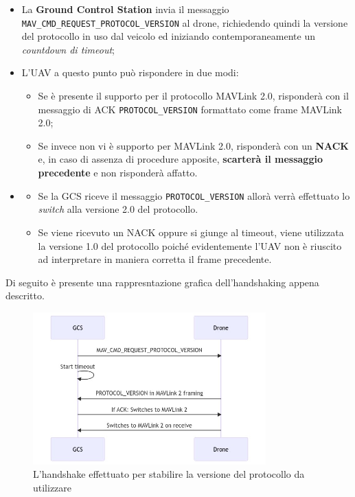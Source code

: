 \documentclass[a4paper, 12pt, oneside]{article}
\theoremstyle{definition}
\begin{document}
\begin{itemize}
    \item La \textbf{Ground Control Station} invia il messaggio \texttt{MAV\_CMD\_REQUEST\_PROTOCOL\_VERSION} al drone, richiedendo quindi la versione del protocollo in uso dal veicolo ed iniziando contemporaneamente un \textit{countdown di timeout};
    \item L'UAV a questo punto può rispondere in due modi: \begin{itemize}
        \item Se è presente il supporto per il protocollo MAVLink 2.0, risponderà con il messaggio di ACK \texttt{PROTOCOL\_VERSION} formattato come frame MAVLink 2.0;
        \item Se invece non vi è supporto per MAVLink 2.0, risponderà con un \textbf{NACK} e, in caso di assenza di procedure apposite, \textbf{scarterà il messaggio precedente} e non risponderà affatto.
    \end{itemize}
    \item \begin{itemize}
        \item Se la GCS riceve il messaggio \texttt{PROTOCOL\_VERSION} allorà verrà effettuato lo \textit{switch} alla versione 2.0 del protocollo.
        \item Se viene ricevuto un NACK oppure si giunge al timeout, viene utilizzata la versione 1.0 del protocollo poiché evidentemente l'UAV non è riuscito ad interpretare in maniera corretta il frame precedente.
        \end{itemize} 
\end{itemize}

\newpage

Di seguito è presente una rappresntazione grafica dell'handshaking appena descritto.

\begin{figure}[H]
    \centering
    \includegraphics[width=0.8\textwidth]{images/handshake_mavlink.jpeg}
    \caption{L'handshake effettuato per stabilire la versione del protocollo da utilizzare}
\end{figure}
\end{document}
